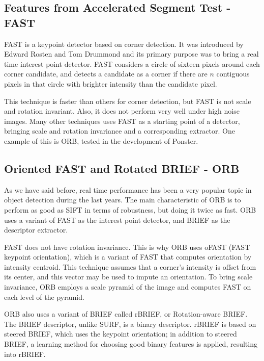 \subsection{Features from Accelerated Segment Test - FAST}
FAST is a keypoint detector based on corner detection. It was introduced by
Edward Rosten and Tom Drummond\cite{Rosten:2006:MLH:2094437.2094478} and its
primary purpose was to bring a real 
time interest point detector. FAST considers a circle of sixteen pixels around
each corner candidate, and detects a candidate as a corner if there are $n$
contiguous pixels in that circle with brighter intensity than the candidate
pixel. %

This technique is faster than others for corner detection, but FAST is not
scale and rotation invariant. Also, it does not perform very well under high
noise images. Many other techniques uses FAST as a starting point of a
detector, bringing scale and rotation invariance and a corresponding
extractor. One example of this is ORB, tested in the development of Ponster.

\subsection{Oriented FAST and Rotated BRIEF - ORB}
As we have said before, real time performance has been a very popular topic in
object detection during the last years. The main characteristic of ORB is to
perform as good as SIFT in terms of robustness, but doing it twice as fast. ORB
uses a variant of FAST as the interest point detector, and BRIEF as the
descriptor extractor.  

FAST does not have rotation invariance. This is why ORB uses oFAST (FAST
keypoint orientation), which is a variant of FAST that computes orientation by
intensity centroid. This technique assumes that a corner's intensity is offset
from its center, and this vector may be used to impute an
orientation\cite{6126544}. To bring scale invariance, ORB employs a scale pyramid of
the image and computes FAST on each level of the pyramid.

ORB also uses a variant of BRIEF called rBRIEF, or Rotation-aware BRIEF. The
BRIEF descriptor, unlike SURF, is a binary descriptor. rBRIEF is based on
steered BRIEF, which uses the keypoint orientation; in addition to steered
BRIEF, a learning method for choosing good binary features is applied,
resulting into rBRIEF.

